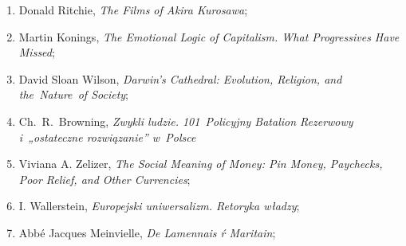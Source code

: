 \documentclass[a4paper,11pt]{article}
\begin{document}
\begin{enumerate}


\item Donald Ritchie, \emph{The Films of Akira Kurosawa};

\item Martin Konings, \emph{The Emotional Logic of Capitalism. What
    Progressives Have Missed};

\item David Sloan Wilson, \emph{Darwin's Cathedral: Evolution,
    Religion, and the~Nature~of Society};

\item Ch.~R.~Browning, \emph{Zwykli ludzie. 101~Policyjny Batalion
    Rezerwowy i~„ostateczne rozwiązanie” w~Polsce}

\item Viviana A. Zelizer, \emph{The Social Meaning of Money: Pin
    Money, Paychecks, Poor Relief, and Other Currencies};








\item I. Wallerstein, \emph{Europejski uniwersalizm. Retoryka władzy};

\item Abbé Jacques Meinvielle, \emph{De Lamennais ŕ Maritain};









\end{enumerate}
\end{document}
